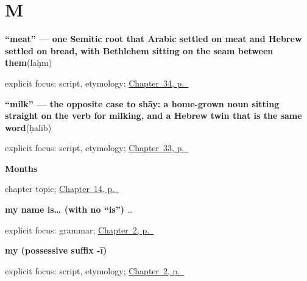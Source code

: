 \section*{M}

\noindent\begin{minipage}[t]{\linewidth}
\raggedright
\textbf{\textquotedblleft{}meat\textquotedblright{} — one Semitic root that Arabic settled on meat and Hebrew settled on bread, with Bethlehem sitting on the seam between them}\enspace\emph{}\enspace(laḥm)\par
\footnotesize explicit focus: script, etymology; \hyperref[ch:ar-asking-for-food]{Chapter~34, p.~\pageref*{ch:ar-asking-for-food}}
\end{minipage}\par\smallskip

\noindent\begin{minipage}[t]{\linewidth}
\raggedright
\textbf{\textquotedblleft{}milk\textquotedblright{} — the opposite case to shāy: a home-grown noun sitting straight on the verb for milking, and a Hebrew twin that is the same word}\enspace\emph{}\enspace(ḥalīb)\par
\footnotesize explicit focus: script, etymology; \hyperref[ch:ar-asking-for-a-drink]{Chapter~33, p.~\pageref*{ch:ar-asking-for-a-drink}}
\end{minipage}\par\smallskip

\noindent\begin{minipage}[t]{\linewidth}
\raggedright
\textbf{Months}\par
\footnotesize chapter topic; \hyperref[ch:ar-months]{Chapter~14, p.~\pageref*{ch:ar-months}}
\end{minipage}\par\smallskip

\noindent\begin{minipage}[t]{\linewidth}
\raggedright
\textbf{my name is… (with no \textquotedblleft{}is\textquotedblright{})}\enspace\emph{ …}\par
\footnotesize explicit focus: grammar; \hyperref[ch:introductions]{Chapter~2, p.~\pageref*{ch:introductions}}
\end{minipage}\par\smallskip

\noindent\begin{minipage}[t]{\linewidth}
\raggedright
\textbf{my (possessive suffix -ī)}\enspace\emph{}\par
\footnotesize explicit focus: script, etymology; \hyperref[ch:introductions]{Chapter~2, p.~\pageref*{ch:introductions}}
\end{minipage}\par\smallskip


